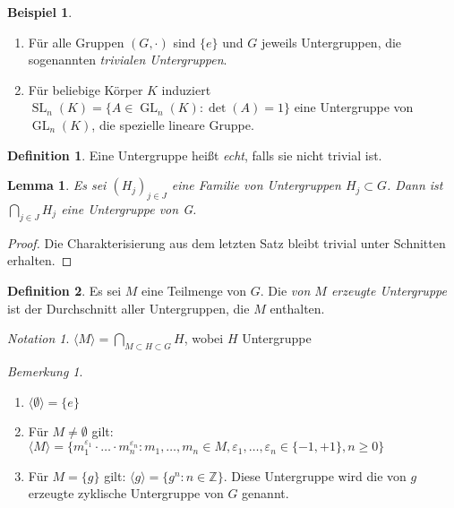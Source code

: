 \documentclass[12pt]{scrartcl} %
\DeclareMathOperator{\GL}{GL}
\DeclareMathOperator{\SL}{SL}
\newtheorem{lemma}[thm]{Lemma}
\theoremstyle{definition}
\newtheorem*{defn}{Definition}
\newtheorem{ex}{Beispiel}
\theoremstyle{remark}
\newtheorem*{notation}{Notation}
\newtheorem*{nb}{Bemerkung}
\begin{document}
\begin{ex}
	\begin{enumerate}[label=(\alph*)]
	\item Für alle Gruppen $(G,\cdot)$ sind $\{e\}$ und $G$ jeweils Untergruppen, die sogenannten \emph{trivialen Untergruppen}.
	\item Für beliebige Körper $K$ induziert $\SL_n(K)=\{A\in \GL_n(K): \det(A)=1\}$ eine Untergruppe von $\GL_n(K)$, die spezielle lineare Gruppe.
	\end{enumerate}
\end{ex}

\begin{defn}
	Eine Untergruppe heißt \emph{echt}, falls sie nicht trivial ist.
\end{defn}

\begin{lemma}
	Es sei $(H_{j})_{j \in J}$ eine Familie von Untergruppen $H_{j} \subset G$.
	Dann ist $\bigcap_{j \in J}H_{j}$ eine Untergruppe von G.
\end{lemma}

\begin{proof}
	Die Charakterisierung aus dem letzten Satz bleibt trivial unter Schnitten erhalten.
\end{proof}

\begin{defn}
	Es sei $M$ eine Teilmenge von $G$.
	Die \emph{von $M$ erzeugte Untergruppe} ist der Durchschnitt aller Untergruppen, die $M$ enthalten.
\end{defn}

\begin{notation}
	$\langle M \rangle =\bigcap_{M \subset H \subset G}H$, wobei $H$ Untergruppe
\end{notation}

\begin{nb}
	\begin{enumerate}[label=(\alph*)]
	\item $\langle \emptyset \rangle = \lbrace e \rbrace$
	\item Für $M \neq \emptyset$ gilt: $\langle M \rangle = \lbrace m_{1}^{\varepsilon_{1}} \cdot \dots \cdot m_{n}^{\varepsilon_{n}} : m_{1},\dots,m_{n} \in M, \varepsilon_{1},\dots,\varepsilon_{n} \in \lbrace -1,+1\rbrace, n \geq 0 \rbrace$
	\item Für $M = \lbrace g \rbrace$ gilt: $\langle g \rangle = \lbrace g^{n} : n \in \mathbb{Z} \rbrace$. Diese Untergruppe wird die von $g$ erzeugte zyklische Untergruppe von $G$ genannt.
	\end{enumerate}
\end{nb}
\end{document}
